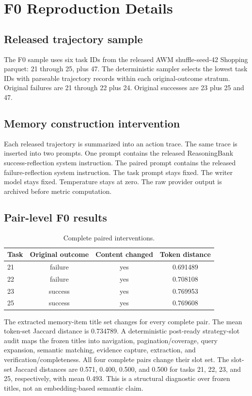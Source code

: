 \section{F0 Reproduction Details}
\subsection{Released trajectory sample}
The F0 sample uses six task IDs from the released AWM shuffle-seed-42 Shopping parquet: 21 through 25, plus 47. The deterministic sampler selects the lowest task IDs with parseable trajectory records within each original-outcome stratum. Original failures are 21 through 22 plus 24. Original successes are 23 plus 25 and 47.

\subsection{Memory construction intervention}
Each released trajectory is summarized into an action trace. The same trace is inserted into two prompts. One prompt contains the released ReasoningBank success-reflection system instruction. The paired prompt contains the released failure-reflection system instruction. The task prompt stays fixed. The writer model stays fixed. Temperature stays at zero. The raw provider output is archived before metric computation.

\subsection{Pair-level F0 results}
\begin{table}[h]
\centering
\caption{Complete paired interventions.}
\small
\begin{tabular}{lccc}
\toprule
Task & Original outcome & Content changed & Token distance \\
\midrule
21 & failure & yes & 0.691489 \\
22 & failure & yes & 0.708108 \\
23 & success & yes & 0.769953 \\
25 & success & yes & 0.769608 \\
\bottomrule
\end{tabular}
\end{table}

The extracted memory-item title set changes for every complete pair. The mean token-set Jaccard distance is 0.734789. A deterministic post-ready strategy-slot audit maps the frozen titles into navigation, pagination/coverage, query expansion, semantic matching, evidence capture, extraction, and verification/completeness. All four complete pairs change their slot set. The slot-set Jaccard distances are 0.571, 0.400, 0.500, and 0.500 for tasks 21, 22, 23, and 25, respectively, with mean 0.493. This is a structural diagnostic over frozen titles, not an embedding-based semantic claim.

